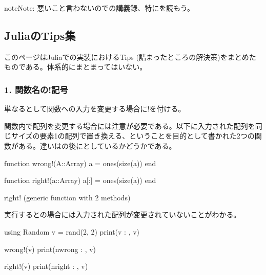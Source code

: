 \documentclass[letterpaper,10pt,english]{sphinxmanual}
\begin{document}
\begin{sphinxadmonition}{note}{Note:}
悪いこと言わないのでの講義録、特にを読もう。
\end{sphinxadmonition}


\subsection{JuliaのTips集}
\label{\detokenize{tips:juliatips}}\label{\detokenize{tips::doc}}
このページはJuliaでの実装におけるTips (詰まったところの解決策)をまとめたものである。体系的にまとまってはいない。


\subsubsection{1. 関数名の!記号}
\label{\detokenize{tips:id1}}
単なるとして関数への入力を変更する場合に!を付ける。

関数内で配列を変更する場合には注意が必要である。以下に入力された配列を同じサイズの要素1の配列で置き換える、ということを目的として書かれた2つの関数がある。違いはの後に\sphinxcode{\sphinxupquote{{[}:{]}}}としているかどうかである。

\begin{sphinxVerbatim}[commandchars=\\\{\}]
function wrong!(A::Array)
    a = ones(size(a))
end

function right!(a::Array)
    a[:] = ones(size(a))
end
\end{sphinxVerbatim}

\begin{sphinxVerbatim}[commandchars=\\\{\}]
right! (generic function with 2 methods)
\end{sphinxVerbatim}

実行するとの場合には入力された配列が変更されていないことがわかる。

\begin{sphinxVerbatim}[commandchars=\\\{\}]
using Random
v = rand(2, 2)
print(\PYGZdq{}v : \PYGZdq{}, v)

wrong!(v)
print(\PYGZdq{}\PYGZbs{}nwrong : \PYGZdq{}, v)

right!(v)
print(\PYGZdq{}\PYGZbs{}nright : \PYGZdq{}, v)
\end{sphinxVerbatim}
\end{document}
